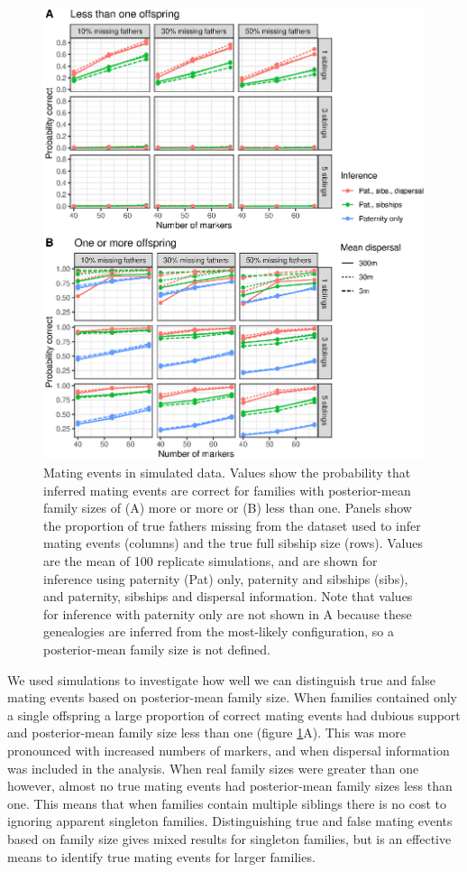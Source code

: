 \documentclass[10pt, a4paper, twocolumn]{article} %
\begin{document}
\begin{figure}
    \centering
    \includegraphics{fig-sim_mating.eps}
    \caption{
        Mating events in simulated data.
        Values show the probability that inferred mating events are correct for families with posterior-mean family sizes of (A) more or more or (B) less than one.
        Panels show the proportion of true fathers missing from the dataset used to infer mating events (columns) and the true full sibship size (rows).
        Values are the mean of 100 replicate simulations, and are shown for inference using paternity (Pat) only, paternity and sibships (sibs), and paternity, sibships and dispersal information.
        Note that values for inference with paternity only are not shown in A because these genealogies are inferred from the most-likely configuration, so a posterior-mean family size is not defined.
    }
    \label{fig:sim-mating}
\end{figure}

We used simulations to investigate how well we can distinguish true and false mating events based on posterior-mean family size.
When families contained only a single offspring a large proportion of correct mating events had dubious support and posterior-mean family size less than one (figure \ref{fig:sim-mating}A).
This was more pronounced with increased numbers of markers, and when dispersal information was included in the analysis.
When real family sizes were greater than one however, almost no true mating events had posterior-mean family sizes less than one.
This means that when families contain multiple siblings there is no cost to ignoring apparent singleton families.
Distinguishing true and false mating events based on family size gives mixed results for singleton families, but is an effective means to identify true mating events for larger families.
\end{document}
